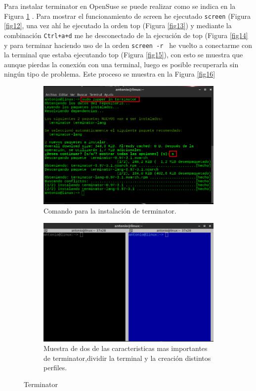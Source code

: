 Para instalar terminator en OpenSuse se puede realizar como se indica en la Figura \ref{fig10} . Para mostrar el funcionamiento de screen he ejecutado \texttt{screen} (Figura \ref{fig12}, una vez ahí he ejecutado la orden top (Figura \ref{fig13}) y mediante la combinación \texttt{Ctrl+a+d} me he desconectado de la ejecución de top (Figura \ref{fig14} y para terminar haciendo uso de la orden \texttt{screen -r } he vuelto a conectarme con la terminal que estaba ejecutando top (Figura \ref{fig15}), con esto se muestra que aunque pierdas la conexión con una terminal, luego es posible recuperarla sin ningún tipo de problema. Este proceso se muestra en la Figura \ref{fig16}


\begin{figure}[H]
    \centering
    \begin{subfigure}[b]{0.55\textwidth}
        \includegraphics[width=\textwidth]{imagenes/img11}
        \caption{Comando para la instalación de terminator.}
        \label{fig10}
    \end{subfigure}
    \begin{subfigure}[b]{0.4\textwidth}
        \includegraphics[width=\textwidth]{imagenes/img10}
        \caption{Muestra de dos de las caracteristicas mas importantes de terminator,dividir la terminal y la creación distintos perfiles.}
        \label{fig11}
    \end{subfigure}
    \caption{Terminator}
\end{figure}



